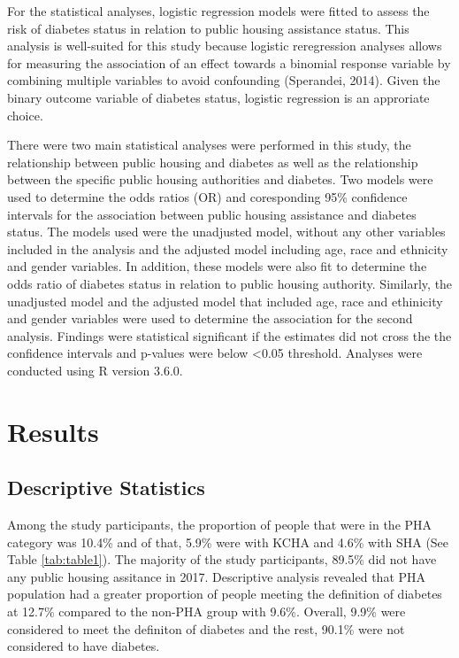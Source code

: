 \documentclass [11pt, proquest] {uwthesis}[2015/03/03]
\begin{document}
For the statistical analyses, logistic regression models were fitted to
assess the risk of diabetes status in relation to public housing
assistance status. This analysis is well-suited for this study because
logistic reregression analyses allows for measuring the association of
an effect towards a binomial response variable by combining multiple
variables to avoid confounding (Sperandei, 2014). Given the binary
outcome variable of diabetes status, logistic regression is an
approriate choice.

There were two main statistical analyses were performed in this study,
the relationship between public housing and diabetes as well as the
relationship between the specific public housing authorities and
diabetes. Two models were used to determine the odds ratios (OR) and
coresponding 95\% confidence intervals for the association between
public housing assistance and diabetes status. The models used were the
unadjusted model, without any other variables included in the analysis
and the adjusted model including age, race and ethnicity and gender
variables. In addition, these models were also fit to determine the odds
ratio of diabetes status in relation to public housing authority.
Similarly, the unadjusted model and the adjusted model that included
age, race and ethinicity and gender variables were used to determine the
association for the second analysis. Findings were statistical
significant if the estimates did not cross the the confidence intervals
and p-values were below \textless{}0.05 threshold. Analyses were
conducted using R version 3.6.0.

\chapter{Results}\label{ref-labels}

\section{Descriptive Statistics}\label{descriptive-statistics}

Among the study participants, the proportion of people that were in the
PHA category was 10.4\% and of that, 5.9\% were with KCHA and 4.6\% with
SHA (See Table \ref{tab:table1}). The majority of the study
participants, 89.5\% did not have any public housing assitance in 2017.
Descriptive analysis revealed that PHA population had a greater
proportion of people meeting the definition of diabetes at 12.7\%
compared to the non-PHA group with 9.6\%. Overall, 9.9\% were considered
to meet the definiton of diabetes and the rest, 90.1\% were not
considered to have diabetes.
\end{document}

